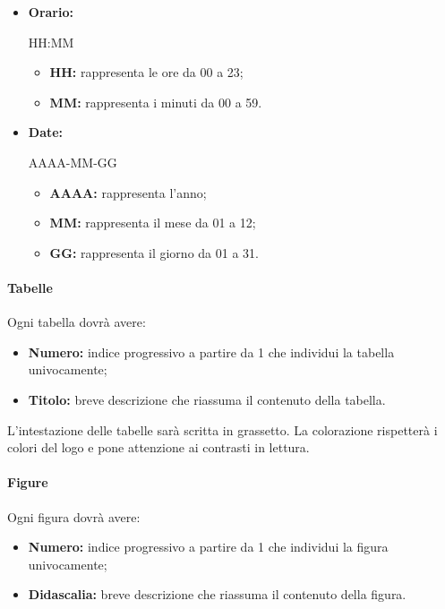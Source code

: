 \documentclass[11pt,a4paper]{article}
\begin{document}
{	\begin{itemize}
		\item \textbf{Orario:} 
		\begin{center}
			HH:MM
		\end{center}
		\begin{itemize}
			\item \textbf{HH:} rappresenta le ore da 00 a 23;
			\item \textbf{MM:} rappresenta i minuti da 00 a 59.
		\end{itemize} 
		
		\item \textbf{Date:}
		\begin{center}
			AAAA-MM-GG
		\end{center}
		\begin{itemize}
			\item \textbf{AAAA:} rappresenta l'anno;
			\item \textbf{MM:} rappresenta il mese da 01 a 12;
			\item \textbf{GG:} rappresenta il giorno da 01 a 31.
		\end{itemize}
		
	\end{itemize}
	
	\paragraph{Tabelle\\}	
	Ogni tabella dovrà avere:
	\begin{itemize}
		\item \textbf{Numero:} indice progressivo a partire da 1 che individui la tabella univocamente;
		\item \textbf{Titolo:} breve descrizione che riassuma il contenuto della tabella.
	\end{itemize}
	L'intestazione delle tabelle sarà scritta in grassetto. La colorazione rispetterà i colori del logo e pone attenzione ai contrasti in lettura.
	
	
	
	\paragraph{Figure\\}
	Ogni figura dovrà avere:
	\begin{itemize}
		\item \textbf{Numero:} indice progressivo a partire da 1 che individui la figura univocamente;
		\item \textbf{Didascalia:} breve descrizione che riassuma il contenuto della figura.
	\end{itemize}
}
\end{document}
